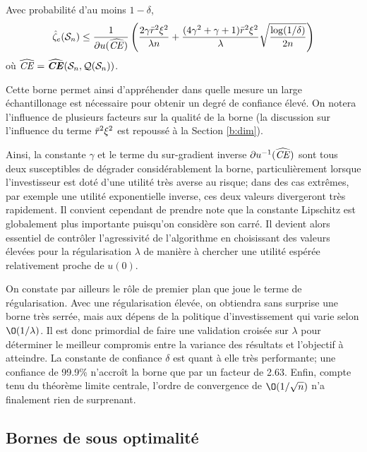 \begin{thm}
  \label{thm2}
  Avec probabilité d'au moins $1-\delta$,
  \begin{equation}
    \hat\zeta_e(\mathcal S_n) \leq \frac{1}{\partial u(\operatorname{\widehat{\operatorname{\mbox{\textit{CE}}}}})}\left( \frac{2\gamma\bar r^2\xi^2}{\lambda n} + \frac{(4\gamma^2 + \gamma +
        1)\bar r^2\xi^2}{\lambda}\sqrt{\frac{\log(1/\delta)}{2n}}\right) 
  \end{equation}
  où $\operatorname{\widehat{\operatorname{\mbox{\textit{CE}}}}} = \operatorname{\widehat{\operatorname{\mbox{\textbf{\textit{CE}}}}}}(\mathcal S_n,\mathcal{Q}(\mathcal S_n))$. 
\end{thm}

Cette borne permet ainsi d'appréhender dans quelle mesure un large échantillonage est
nécessaire pour obtenir un degré de confiance élevé. On notera l'influence de plusieurs
facteurs sur la qualité de la borne (la discussion sur l'influence du terme $\bar r^2\xi^2$
est repoussé à la Section \ref{b:dim}).

Ainsi, la constante $\gamma$ et le terme du sur-gradient inverse $\partial u^{-1}(\operatorname{\widehat{\operatorname{\mbox{\textit{CE}}}}})$ sont tous
deux susceptibles de dégrader considérablement la borne, particulièrement lorsque
l'investisseur est doté d'une utilité très averse au risque; dans des cas extrêmes, par
exemple une utilité exponentielle inverse, ces deux valeurs divergeront très
rapidement. Il convient cependant de prendre note que la constante Lipschitz est
globalement plus importante puisqu'on considère son carré. Il devient alors essentiel de
contrôler l'agressivité de l'algorithme en choisissant des valeurs élevées pour la
régularisation $\lambda$ de manière à chercher une utilité espérée relativement proche de
$u(0)$.

On constate par ailleurs le rôle de premier plan que joue le terme de régularisation. Avec
une régularisation élevée, on obtiendra sans surprise une borne très serrée, mais aux
dépens de la politique d'investissement qui varie selon $\O(1/\lambda)$. Il est donc primordial
de faire une validation croisée sur $\lambda$ pour déterminer le meilleur compromis entre la
variance des résultats et l'objectif à atteindre. La constante de confiance $\delta$ est quant
à elle très performante; une confiance de \num{99.9}\% n'accroît la borne que par un
facteur de \num{2.63}. Enfin, compte tenu du théorème limite centrale, l'ordre de
convergence de $\O(1/\sqrt{n})$ n'a finalement rien de surprenant.




\subsection{Bornes de sous optimalité}
\label{b:sopt}

